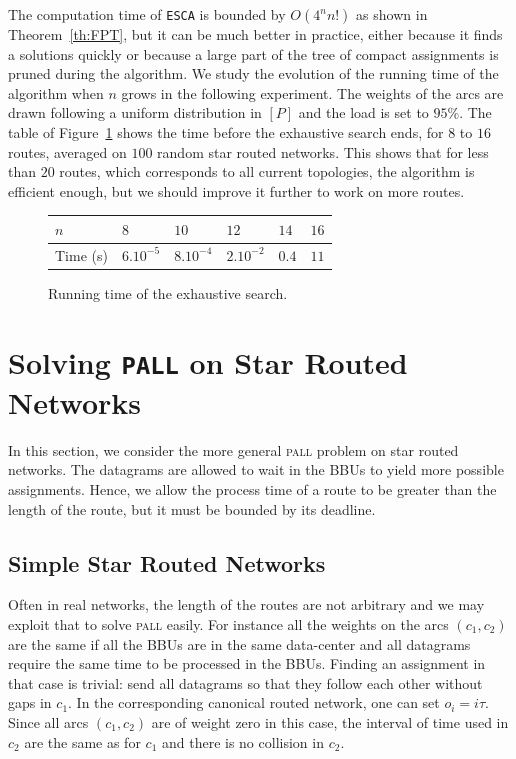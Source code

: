 \documentclass[a4paper,10pt]{article}
\newcommand\ESCA{\texttt{ESCA}\xspace}
\newcommand\pall{\textsc{pall}\xspace}
\begin{document}
       The computation time of \ESCA is bounded by $O(4^nn!)$ as shown in Theorem~\ref{th:FPT}, but it can be much better in practice, either because it finds a solutions quickly or because a large part of the tree of compact assignments is pruned during the algorithm. We study the evolution of the running time  of the algorithm when $n$ grows in the following experiment. The weights of the arcs are drawn following a uniform distribution in $[P]$ and the load is set to $95\%$.  The table of Figure~\ref{fig:table} shows the time before the exhaustive search ends, for $8$ to $16$ routes, averaged on $100$ random star routed networks. This shows that for less than $20$ routes, which corresponds to all current topologies, the algorithm is efficient enough, but we should improve it further to work on more routes.
       
             \begin{figure}[h]
         \begin{center}
         \begin{tabularx}{0.9\textwidth}{|l|X|X|X|X|X|}
    \hline
   $n$ & $8$ & $10$& $12$&$14$& $16$\\
    \hline
   Time (s) & $6.10^{-5}$&$8.10^{-4}$&$2.10^{-2}$& $0.4$& $11$\\
    \hline
      \end{tabularx}
      \end{center}
      \caption{Running time of the exhaustive search.}
      \label{fig:table}
      \end{figure}
      
         \section{Solving \texttt{PALL} on Star Routed Networks}\label{sec:PALL}
    
    In this section, we consider the more general \pall problem on star routed networks. The datagrams are allowed to wait in the BBUs to yield more possible assignments. Hence, we allow the process time of a route to be greater than the length of the route, but it must be bounded by its deadline.


	\subsection{Simple Star Routed Networks}
		

	Often in real networks, the length of the routes are not arbitrary and we may exploit that to solve \pall easily. For instance all the weights on the arcs $(c_1,c_2)$ are the same if all the BBUs are in the same data-center and all datagrams require the same time to be processed in the BBUs.
Finding an assignment in that case is trivial: send all datagrams so that they follow each other without gaps in $c_1$. In the corresponding canonical routed network, one can set $o_i = i\tau$.  Since all arcs $(c_1,c_2)$ are of weight zero in this case, the interval of time used in $c_2$ are the same as for $c_1$ and there is no collision in $c_2$.
\end{document}
